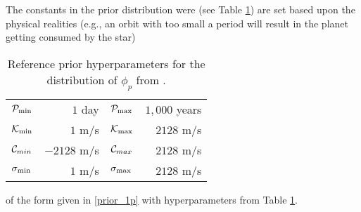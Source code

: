 The constants in the prior distribution were (see Table
\ref{tab:hyper}) are set based upon the physical  
realities (e.g., an orbit with too small a period will result in the
planet getting consumed by the star) 
\begin{table}[h]
  \begin{center}
  \begin{tabular} {|lr|lr|} \hline \hline
$\P_{\min}$ &  $1$ day &
$\P_{\max}$ &  $1,000$ years \\
$\K_{\min}$ &  $ 1$ m/s & 
$\K_{\max}$ &  $2128$ m/s \\
$\C_{min}$ &  $-2128$ m/s & 
$\C_{max}$ &   $2128$ m/s \\
$\sj_{\min}$ &  $1$ m/s &
$\sj_{\max}$ &  $2128$ m/s \\ \hline
  \end{tabular}
  \end{center}
\caption{Reference prior hyperparameters for the distribution of
  $\phi_p$ from \citet{ford2006bms}.}
\label{tab:hyper}
\end{table}
 of the form given in \ref{prior_1p}
with hyperparameters from Table \ref{tab:hyper}.
